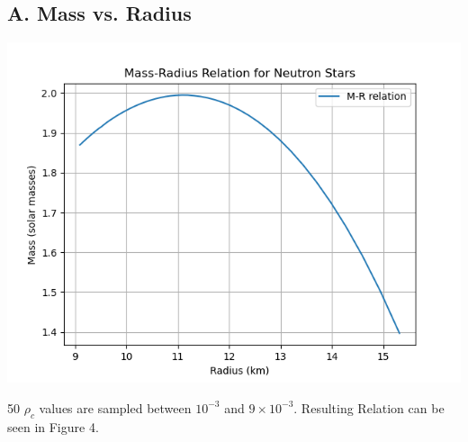 \documentclass{article}
\begin{document}
\subsection*{A. Mass vs. Radius}

\begin{center}
    \includegraphics[scale=0.65]{images_einstein/e1_mass_vs_radius.png}
\end{center}
50 $\rho_c$ values are sampled between $10^{-3}$ and $9 \times10^{-3}$. Resulting Relation can be seen in Figure 4.
\end{document}
